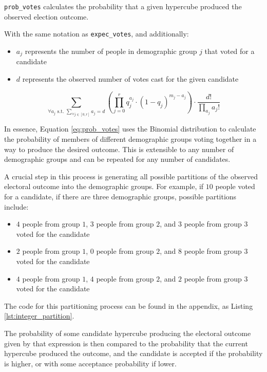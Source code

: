 \documentclass[fleqn,10pt]{style}
\begin{document}
\texttt{prob\_votes} calculates the probability that a given hypercube produced the observed election outcome.

With the same notation as \texttt{expec\_votes}, and additionally:

\begin{itemize}[noitemsep]
  \item $a_j$ represents the number of people in demographic group $j$ that voted for a candidate
  \item $d$ represents the observed number of votes cast for the given candidate
\end{itemize}

\begin{equation}
 \sum_{\forall a_j \text{ s.t. } \sum_{\forall j \in [0, r]} a_j = d} \left(\prod_{j = 0}^r q_j^{a_j} \cdot (1 - q_j)^{m_j - a_j}\right) \cdot \frac{d!}{\prod_{a_j}a_j!}
 \label{eq:prob_votes}
\end{equation}

In essence, Equation \ref{eq:prob_votes} uses the Binomial distribution to calculate the probability of members of different demographic groups voting together in a way to produce the desired outcome. This is extensible to any number of demographic groups and can be repeated for any number of candidates.

A crucial step in this process is generating all possible partitions of the observed electoral outcome into the demographic groups. For example, if $10$ people voted for a candidate, if there are three demographic groups, possible partitions include:

\begin{itemize}
  \item $4$ people from group $1$, $3$ people from group $2$, and $3$ people from group $3$ voted for the candidate
  \item $2$ people from group $1$, $0$ people from group $2$, and $8$ people from group $3$ voted for the candidate
  \item $4$ people from group $1$, $4$ people from group $2$, and $2$ people from group $3$ voted for the candidate
\end{itemize}

The code for this partitioning process can be found in the appendix, as Listing \ref{lst:integer_partition}.

The probability of some candidate hypercube producing the electoral outcome given by that expression is then compared to the probability that the current hypercube produced the outcome, and the candidate is accepted if the probability is higher, or with some acceptance probability if lower.
\end{document}
